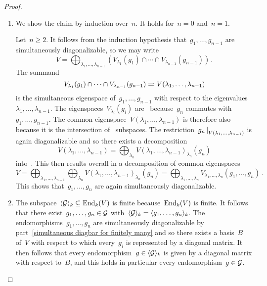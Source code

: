 \begin{proof}
  \leavevmode
  \begin{enumerate}
    \item
      We show the claim by induction over~$n$.
      It holds for~$n = 0$ and~$n = 1$.
      
      Let~$n \geq 2$.
      It follows from the induction hypothesis that~$g_1, \dotsc, g_{n-1}$ are simultaneously diagonalizable, so we may write
      \[
          V
        = \bigoplus_{\lambda_1, \dotsc, \lambda_{n-1}}
          \left(
            V_{\lambda_1}(g_1) \cap \dotsb \cap V_{\lambda_{n-1}}(g_{n-1})
          \right) \,.
      \]
      The summand
      \[
                  V_{\lambda_1}(g_1) \cap \dotsb \cap V_{\lambda_{n-1}}(g_{n-1})
        \eqqcolon  V(\lambda_1, \dotsc, \lambda_{n-1})
      \]
      is the simultaneous eigenspace of~$g_1, \dotsc, g_{n-1}$ with respect to the eigenvalues~$\lambda_1, \dotsc, \lambda_{n-1}$.
      The eigenspaces~$V_{\lambda_i}(g_i)$ are~ because~$g_n$ commutes with~$g_1, \dotsc, g_{n-1}$.
      The common eigenspace~$V(\lambda_1, \dotsc, \lambda_{n-1})$ is therefore also~ because it is the intersection of~ subspaces.
      The restriction~$\restrict{g_n}{V(\lambda_1, \dotsc, \lambda_{n-1})}$ is again diagonalizable and so there exists a decomposition
      \[
          V(\lambda_1, \dotsc, \lambda_{n-1})
        = \bigoplus_{\lambda_n} V(\lambda_1, \dotsc, \lambda_{n-1})_{\lambda_n}(g_n)
      \]
      into~.
      This then results overall in a decomposition of common eigenspaces
      \[
          V
        = \bigoplus_{\lambda_1, \dotsc, \lambda_{n-1}}
          \bigoplus_{\lambda_n}
          V(\lambda_1, \dotsc, \lambda_{n-1})_{\lambda_n}(g_n)
        = \bigoplus_{\lambda_1, \dotsc, \lambda_n}
          V_{\lambda_1, \dotsc, \lambda_n}(g_1, \dotsc, g_n) \,.
      \]
      This shows that~$g_1, \dotsc, g_n$ are again simultaneously diagonalizable.
    \item
      The subspace~$\langle \mathcal{G} \rangle_k \subseteq \operatorname{End}_k(V)$ is finite because~$\operatorname{End}_k(V)$ is finite.
      It follows that there exist~$g_1, \dotsc, g_n \in \mathcal{G}$ with~$\langle \mathcal{G} \rangle_k = \langle g_1, \dotsc, g_n\rangle_k$.
      The endomorphisms~$g_1, \dotsc, g_n$ are simultaneously diagonalizable by part~\ref*{simultaneous diagbar for finitely many} and so there exists a basis~$B$ of~$V$ with respect to which every~$g_i$ is represented by a diagonal matrix.
      It then follows that every endomorphism~$g \in \langle \mathcal{G} \rangle_k$ is given by a diagonal matrix with respect to~$B$, and this holds in particular every endomorphism~$g \in \mathcal{G}$.
    \qedhere
  \end{enumerate}
\end{proof}





